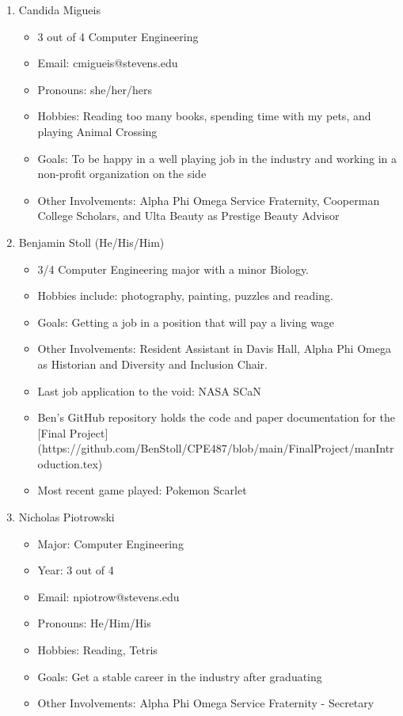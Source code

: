 \begin{enumerate}
    \item Candida Migueis
        \begin{itemize}
            \item 3 out of 4 Computer Engineering
            \item Email: cmigueis@stevens.edu
            \item Pronouns: she/her/hers
            \item Hobbies: Reading too many books, spending time with my pets, and playing Animal Crossing
            \item Goals: To be happy in a well playing job in the industry and working in a non-profit organization on the side
            \item Other Involvements: Alpha Phi Omega Service Fraternity, Cooperman College Scholars, and Ulta Beauty as Prestige Beauty Advisor
        \end{itemize}
    \item Benjamin Stoll (He/His/Him)
        \begin{itemize}
            \item 3/4 Computer Engineering major with a minor Biology. 
            \item Hobbies include: photography, painting, puzzles and reading.
            \item Goals: Getting a job in a position that will pay a living wage
            \item Other Involvements: Resident Assistant in Davis Hall, Alpha Phi Omega as Historian and Diversity and Inclusion Chair.
            \item Last job application to the void: NASA SCaN
            \item Ben's GitHub repository holds the code and paper documentation for the [Final Project](https://github.com/BenStoll/CPE487/blob/main/FinalProject/manIntroduction.tex)
            \item Most recent game played: Pokemon Scarlet
        \end{itemize}
    \item Nicholas Piotrowski
        \begin{itemize}
            \item Major: Computer Engineering
            \item Year: 3 out of 4
            \item Email: npiotrow@stevens.edu
            \item Pronouns: He/Him/His
            \item Hobbies: Reading, Tetris
            \item Goals: Get a stable career in the industry after graduating
            \item Other Involvements: Alpha Phi Omega Service Fraternity - Secretary
        \end{itemize}
\end{enumerate}
